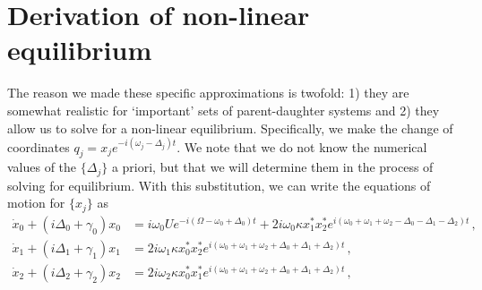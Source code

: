 \section*{Derivation of non-linear equilibrium}\label{section:derivation of non-linear equilibrium}

The reason we made these specific approximations is twofold: 1) they are somewhat realistic for `important' sets of parent-daughter systems and 2) they allow us to solve for a non-linear equilibrium. Specifically, we make the change of coordinates $q_j = x_j e^{-i(\omega_j - \Delta_j)t}$. We note that we do not know the numerical values of the $\{\Delta_j\}$ a priori, but that we will determine them in the process of solving for equilibrium. With this substitution, we can write the equations of motion for $\{x_j\}$ as
\begin{subequations}\label{eq:transformed_3mode_amplitude_eqn's}
\begin{align}
\dot{x}_0 + (i\Delta_0 + \gamma_0)x_0 & = i\omega_0 U e^{-i(\Omega - \omega_0 + \Delta_0)t} + 2i\omega_0\kappa x_1^\ast x_2^\ast e^{i(\omega_0 + \omega_1 + \omega_2 - \Delta_0 - \Delta_1 - \Delta_2)t} \,, \label{subeq:trans_3mode_0}\\
\dot{x}_1 + (i\Delta_1 + \gamma_1)x_1 & = 2i\omega_1\kappa x_0^\ast x_2^\ast e^{i(\omega_0 + \omega_1 + \omega_2 + \Delta_0 + \Delta_1 + \Delta_2)t} \,, \label{subeq:trans_3mode_1} \\
\dot{x}_2 + (i\Delta_2 + \gamma_2)x_2 & = 2i\omega_2\kappa x_0^\ast x_1^\ast e^{i(\omega_0 + \omega_1 + \omega_2 + \Delta_0 + \Delta_1 + \Delta_2)t} \,, \label{subeq:trans_3mode_2} 
\end{align}
\end{subequations}

